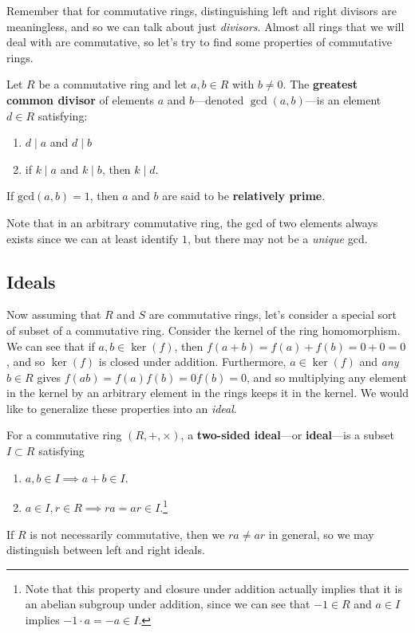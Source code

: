   Remember that for commutative rings, distinguishing left and right divisors are meaningless, and so we can talk about just \textit{divisors}. Almost all rings that we will deal with are commutative, so let's try to find some properties of commutative rings.  

  \begin{definition}
    Let $R$ be a commutative ring and let $a, b \in R$ with $b \neq 0$. The \textbf{greatest common divisor} of elements $a$ and $b$---denoted $\gcd(a, b)$---is an element $d \in R$ satisfying: 
    \begin{enumerate}
      \item $d \mid a$ and $d \mid b$ 
      \item if $k \mid a$ and $k \mid b$, then $k \mid d$. 
    \end{enumerate}
    If $\mathrm{gcd}(a, b) = 1$, then $a$ and $b$ are said to be \textbf{relatively prime}. 
  \end{definition} 

  Note that in an arbitrary commutative ring, the gcd of two elements always exists since we can at least identify $1$, but there may not be a \textit{unique} gcd. 

\subsection{Ideals}

  Now assuming that $R$ and $S$ are commutative rings, let's consider a special sort of subset of a commutative ring. Consider the kernel of the ring homomorphism. We can see that if $a, b \in \ker(f)$, then $f(a + b) = f(a) + f(b) = 0 + 0 = 0$, and so $\ker(f)$ is closed under addition. Furthermore, $a \in \ker(f)$ and \textit{any} $b \in R$ gives $f(ab) = f(a) f(b) = 0 f(b) = 0$, and so multiplying any element in the kernel by an arbitrary element in the rings keeps it in the kernel. We would like to generalize these properties into an \textit{ideal}. 

  \begin{definition}[Ideals]
    For a commutative ring $(R,+, \times)$, a \textbf{two-sided ideal}---or \textbf{ideal}---is a subset $I \subset R$ satisfying 
    \begin{enumerate}
      \item $a, b \in I \implies a + b \in I$. 
      \item $a \in I, r \in R \implies ra = ar \in I$.\footnote{Note that this property and closure under addition actually implies that it is an abelian subgroup under addition, since we can see that $-1 \in R$ and $a \in I$ implies $-1 \cdot a = -a \in I$.}
    \end{enumerate}
    If $R$ is not necessarily commutative, then we $ra \neq ar$ in general, so we may distinguish between left and right ideals. 
  \end{definition}

